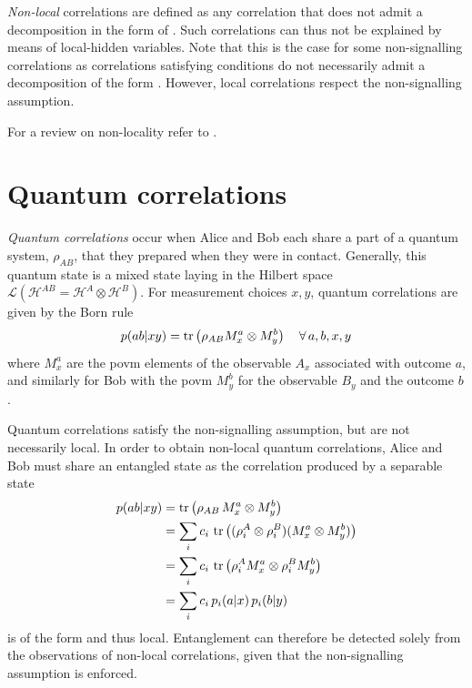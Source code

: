 \medbreak

\textit{Non-local} correlations are defined as any correlation that does not admit a decomposition in the form of .
Such correlations can thus not be explained by means of local-hidden variables. 
Note that this is the case for some non-signalling correlations as correlations satisfying  conditions do not necessarily admit a decomposition of the form .
However, local correlations respect the non-signalling assumption.

For a review on non-locality refer to \cite{Brunner14}.

\section{Quantum correlations}

\textit{Quantum correlations} occur when Alice and Bob each share a part of a quantum system, $\rho_{AB}$, that they prepared when they were in contact.
Generally, this quantum state is a mixed state laying in the Hilbert space $\mathcal{L}(\mathscr{H}^{AB} = \mathscr{H}^{A} \otimes \mathscr{H}^B)$.
For measurement choices $x,y$, quantum correlations are given by the Born rule
\begin{equation}
	p(ab|xy) = \trr{\rho_{AB} M^a_x \otimes M^b_y} \quad \forall\,a,b,x,y
	\label{eq:Born}
\end{equation}
where $M^a_x$ are the \acrfull{povm} elements of the observable $A_x$ associated with outcome $a$, and similarly for Bob with the \acrshort{povm} $M^b_y$ for the observable $B_y$ and the outcome $b$.

\medbreak

Quantum correlations satisfy the non-signalling assumption, but are not necessarily local.
In order to obtain non-local quantum correlations, Alice and Bob must share an entangled state as the correlation produced by a separable state
\begin{equation}
	\begin{split}
		p(ab|xy) &= \trr{\rho_{AB} \, M^a_x \otimes M^b_y} \\
				 &= \sum_i c_i\, \trr{(\rho^A_i \otimes \rho^B_i) (M^a_x \otimes M^b_y)} \\
				 &= \sum_i c_i\, \trr{\rho^A_i M^a_x \otimes \rho^B_i M^b_y} \\
				 &= \sum_i c_i\, p_i(a|x)\, p_i(b|y)
	\end{split}
\end{equation}
is of the form  and thus local.
Entanglement can therefore be detected solely from the observations of non-local correlations, given that the non-signalling assumption is enforced.

